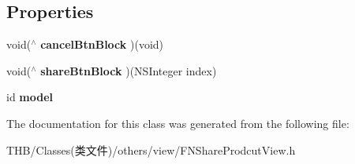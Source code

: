 \subsection*{Properties}
\begin{DoxyCompactItemize}
\item 
\mbox{\label{interface_f_n_share_prodcut_view_aabd98c8bcec76c2986e9a1f5b5d6f914}} 
void($^\wedge$ {\bfseries cancel\+Btn\+Block} )(void)
\item 
\mbox{\label{interface_f_n_share_prodcut_view_ac54412de897da0a36cf62e2ba46f167c}} 
void($^\wedge$ {\bfseries share\+Btn\+Block} )(N\+S\+Integer index)
\item 
\mbox{\label{interface_f_n_share_prodcut_view_af4e133be8e42a6b5afaf4464f6b2cbfd}} 
id {\bfseries model}
\end{DoxyCompactItemize}


The documentation for this class was generated from the following file\+:\begin{DoxyCompactItemize}
\item 
T\+H\+B/\+Classes(类文件)/others/view/F\+N\+Share\+Prodcut\+View.\+h\end{DoxyCompactItemize}
